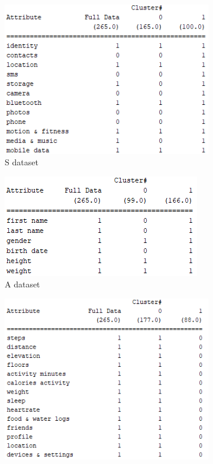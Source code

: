 \begin{figure}
	\centering
	\begin{subfigure}[b]{0.4\linewidth}
		\includegraphics[width=0.85\linewidth]{figures/S_new2.png}
		\caption{S dataset}
		\label{fig:scluster}
	\end{subfigure}
	\begin{subfigure}[b]{0.4\linewidth}
		\includegraphics[width=0.85\linewidth]{figures/A_new2.png}
		\caption{A dataset}
		\label{fig:acluster}
	\end{subfigure}
	\begin{subfigure}[b]{0.4\linewidth}
		\includegraphics[width=0.85\linewidth]{figures/F_new2.png}

\end{subfigure}
\end{figure}
